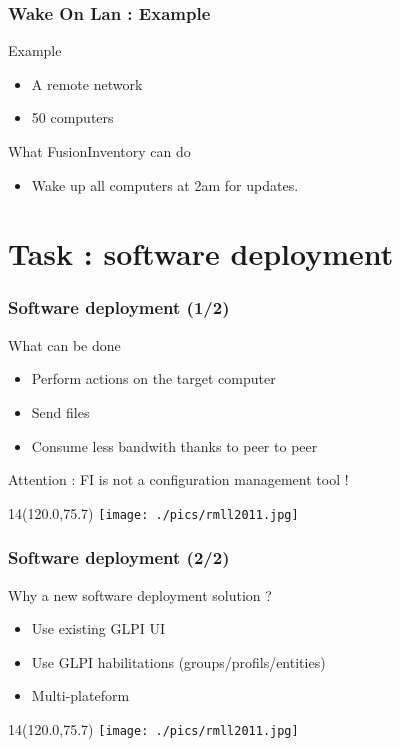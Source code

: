 \documentclass{beamer}
\newcommand{\WorkInProgress}{%
\begin{textblock}{14}(120.0,75.7)
\texttt{[image: ./pics/rmll2011.jpg]}
\end{textblock}
  }
\begin{document}
\begin{frame}
    \frametitle{Wake On Lan : Example}

    \begin{block}{Example}
    \begin{itemize}
    \item A remote network
    \item 50 computers
    \end{itemize}
    \end{block}


    \begin{block}{What FusionInventory can do}
    \begin{itemize}
    \item Wake up all computers at 2am for updates.
    \end{itemize}
    \end{block}

\end{frame}


\section{Task : software deployment}

\begin{frame}
    \frametitle{Software deployment (1/2)}

    \begin{block}{What can be done}
    \begin{itemize}
        \item Perform actions on the target computer
        \item Send files
        \item Consume less bandwith thanks to peer to peer
    \end{itemize}
    Attention : FI is not a configuration management tool !
    \end{block}

\WorkInProgress
\end{frame}

\begin{frame}
    \frametitle{Software deployment (2/2)}

    \begin{block}{Why a new software deployment solution ?}
    \begin{itemize}
        \item Use existing GLPI UI
        \item Use GLPI habilitations (groups/profils/entities)
        \item Multi-plateform
    \end{itemize}
    \end{block}

\WorkInProgress
\end{frame}
\end{document}
